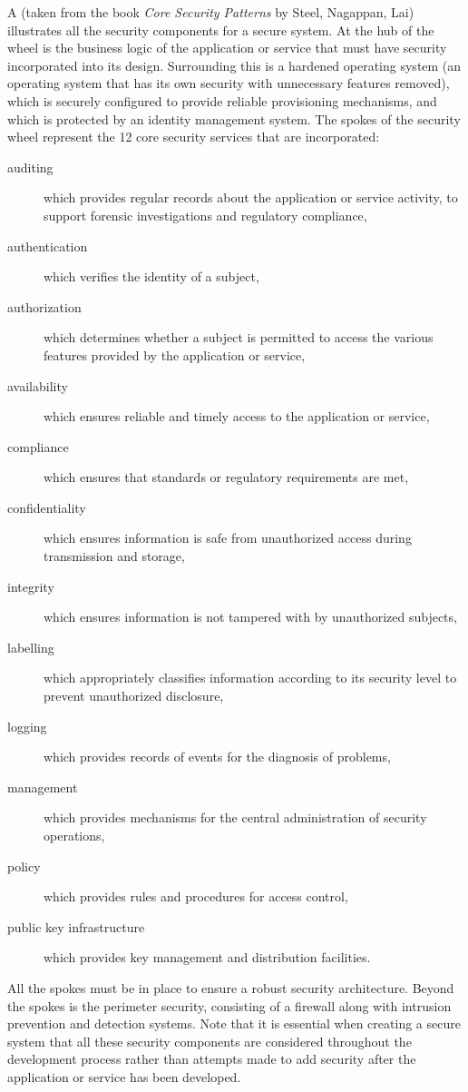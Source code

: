 A 
(taken from the book \emph{Core Security Patterns} by Steel, Nagappan, Lai)
illustrates all the security components for a secure system.
At the hub of the wheel is the business logic of the application or service that
must have security incorporated into its design.
Surrounding this is a hardened operating system (an
operating system that has its own security with unnecessary features removed),
which is securely configured to provide reliable provisioning mechanisms,
and which is protected by an identity management system.
The spokes of the security wheel represent the 12 core security services
that are incorporated:
\begin{description}
	\item[auditing] which provides regular records about the application or
	service activity, to support forensic investigations and regulatory compliance,
	\item[authentication] which verifies the identity of a subject,
	\item[authorization] which determines whether a subject is permitted to
	access the various features provided by the application or service,
	\item[availability] which ensures reliable and timely access to the application or service,
	\item[compliance] which ensures that standards or regulatory requirements
	are met,
	\item[confidentiality] which ensures information is safe from unauthorized access
	during transmission and storage,
	\item[integrity] which ensures information is not tampered with
	by unauthorized subjects,
	\item[labelling] which appropriately classifies information according to
	its security level to prevent unauthorized disclosure,
	\item[logging] which provides records of events for the diagnosis of problems,
	\item[management] which provides mechanisms for the central administration
	of security operations,
	\item[policy] which provides rules and procedures for access control,
	\item[public key infrastructure] which provides key management and distribution facilities.
\end{description}
All the spokes must be in place to ensure a robust security architecture.
Beyond the spokes is the perimeter security, consisting of a firewall along with
intrusion prevention and detection systems.
Note that it is essential when creating a secure system that all these security
components are considered throughout the development process rather than attempts
made to add security after the application or service has been developed.




